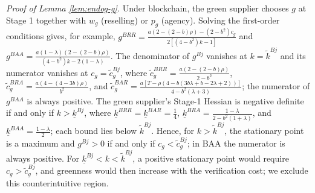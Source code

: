 \documentclass[preprint,review,12pt,authoryear,nopreprintline]{elsarticle}
\theoremstyle{definition}
\begin{document}
\noindent \textit{Proof of Lemma \ref{lem:endog-g}.}
Under blockchain, the green supplier chooses $g$ at Stage 1 together with $w_g$ (reselling) or $p_g$ (agency). Solving the first-order conditions gives, for example, $g^{BRR}=\frac{a(2-(2-b)\rho)-(2-b^2)c_g}{2[(4-b^2)k-1]}$ and $g^{BAA}=\frac{a(1-\lambda)(2-(2-b)\rho)}{(4-b^2)k-2(1-\lambda)}$. The denominator of $g^{Bj}$ vanishes at $k=\tilde{k}^{Bj}$ and its numerator vanishes at $c_g=\tilde{c}_g^{Bj}$, where $\tilde{c}_g^{BRR}=\frac{a(2-(2-b)\rho)}{2-b^2}$, $\tilde{c}_g^{BRA}=\frac{a(4-(4-3b)\rho)}{b^2}$, and $\tilde{c}_g^{BAR}=\frac{a[T-\rho(4-b(3b\lambda+b-2\lambda+2))]}{4-b^2(\lambda+3)}$; the numerator of $g^{BAA}$ is always positive. The green supplier's Stage-1 Hessian is negative definite if and only if $k>\underline{k}^{Bj}$, where $\underline{k}^{BRR}=\underline{k}^{BAR}=\frac{1}{4}$, $\underline{k}^{BRA}=\frac{1-\lambda}{2-b^2(1+\lambda)}$, and $\underline{k}^{BAA}=\frac{1-\lambda}{2}$; each bound lies below $\tilde{k}^{Bj}$. Hence, for $k>\tilde{k}^{Bj}$, the stationary point is a maximum and $g^{Bj}>0$ if and only if $c_g<\tilde{c}_g^{Bj}$; in BAA the numerator is always positive. For $\underline{k}^{Bj}<k<\tilde{k}^{Bj}$, a positive stationary point would require $c_g>\tilde{c}_g^{Bj}$, and greenness would then increase with the verification cost; we exclude this counterintuitive region.
\end{document}

